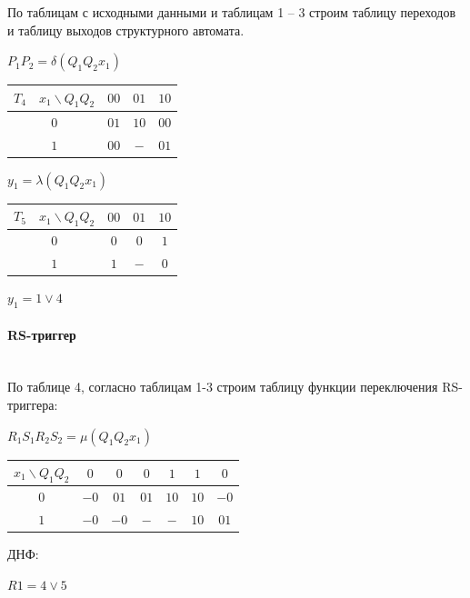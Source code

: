 По таблицам с исходными данными и таблицам 1 – 3 строим таблицу
переходов и таблицу выходов структурного автомата.

$P_1P_2 = \delta(Q_1Q_2x_1)$

\begin{table}[H]
\begin{tabular}{|c|c|c|c|}
\hline
$T_4\quad x_1 \backslash Q_1Q_2$ & $00$ & $01$ & $10$ \\ \hline
$0$          & $01$ & $10$ & $00$ \\ \hline
$1$          & $00$ & $- $ & $01$  \\ \hline
\end{tabular}
\end{table}


$y_1 = \lambda(Q_1Q_2x_1)$


\begin{table}[H]
\begin{tabular}{|c|c|c|c|}
\hline
$T_5\quad x_1 \backslash Q_1Q_2$ & $00$ & $01$ & $10$ \\ \hline
$0$          & $0$ & $0$ & $1$ \\ \hline
$1$          & $1$ & $- $ & $0$  \\ \hline
\end{tabular}
\end{table}

$y_1 = 1 \vee 4$

\paragraph{RS-триггер}\mbox{}\\

По таблице 4, согласно таблицам 1-3 строим таблицу функции
переключения RS-триггера:

$R_1S_1R_2S_2 = \mu(Q_1Q_2x_1)$

\begin{table}[!h]
\begin{tabular}{|c|c|c|c|c|c|c|}
\hline
$x_1 \backslash Q_1Q_2$ & $0$ & $0$ & $0$ & $1$ & $1$ & $0$ \\ \hline
$0$          & $-0$ & $01$ & $01$ & $10$ & $10$ & $-0$ \\ \hline
$1$          & $-0$ & $-0$ & $- $ & $- $ & $10$ & $01$  \\ \hline
\end{tabular}
\end{table}

ДНФ:

$R1 = 4 \vee 5$

